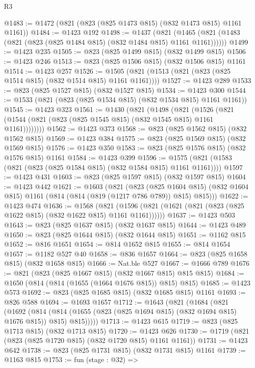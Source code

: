 \begin{lexlean}{R3}
\begin{coremodule}
@1483 := @1472 (@821 (@823 (@825 @1473 @815) (@832 @1473 @815) @1161 @1161))
@1484 := @1423 @192
@1498 := @1437
    (@821 (@1465 (@821 (@1483 (@821 (@823 (@825 @1484 @815) (@832 @1484 @815) @1161 @1161))))))
@1499 := @1423 @235
@1505 := @823 (@825 @1499 @815) (@832 @1499 @815)
@1506 := @1423 @246
@1513 := @823 (@825 @1506 @815) (@832 @1506 @815) @1161
@1514 := @1423 @257
@1526 := @1505 (@821 (@1513 (@821 (@823 (@825 @1514 @815) (@832 @1514 @815) @1161 @1161))))
@1527 := @1423 @289
@1533 := @823 (@825 @1527 @815) (@832 @1527 @815)
@1534 := @1423 @300
@1544 := @1533 (@821 (@823 (@825 @1534 @815) (@832 @1534 @815) @1161 @1161))
@1545 := @1423 @323
@1561 := @1430
    (@821
      (@1498
        (@821
          (@1526 (@821 (@1544 (@821 (@823 (@825 @1545 @815) (@832 @1545 @815) @1161 @1161))))))))
@1562 := @1423 @373
@1568 := @823 (@825 @1562 @815) (@832 @1562 @815)
@1569 := @1423 @384
@1575 := @823 (@825 @1569 @815) (@832 @1569 @815)
@1576 := @1423 @350
@1583 := @823 (@825 @1576 @815) (@832 @1576 @815) @1161
@1584 := @1423 @399
@1596 := @1575 (@821 (@1583 (@821 (@823 (@825 @1584 @815) (@832 @1584 @815) @1161 @1161))))
@1597 := @1423 @431
@1603 := @823 (@825 @1597 @815) (@832 @1597 @815)
@1604 := @1423 @442
@1621 := @1603
    (@821
      (@823
        (@825 @1604 @815)
        (@832 @1604 @815)
        @1161
        (@814 (@814 (@819 (@1217 @786 @789)) @815) @815)))
@1622 := @1423 @474
@1636 := @1568
    (@821 (@1596 (@821 (@1621 (@821 (@823 (@825 @1622 @815) (@832 @1622 @815) @1161 @1161))))))
@1637 := @1423 @503
@1643 := @823 (@825 @1637 @815) (@832 @1637 @815)
@1644 := @1423 @489
@1650 := @823 (@825 @1644 @815) (@832 @1644 @815)
@1651 := @1162 @815
@1652 := @816 @1651
@1654 := @814 @1652 @815
@1655 := @814 @1654
@1657 := @1182 @527 @40
@1658 := @836 @1657
@1664 := @823 (@825 @1658 @815) (@832 @1658 @815)
@1666 := Nat.ble @527
@1667 := @1666 @789
@1676 := @821 (@823 (@825 @1667 @815) (@832 @1667 @815) @815 @815)
@1684 := @1650 (@814 (@814 (@1655 (@1664 @1676 @815)) @815) @815)
@1685 := @1423 @573
@1692 := @823 (@825 @1685 @815) (@832 @1685 @815) @1161
@1693 := @826 @588
@1694 := @1693 @1657
@1712 := @1643
    (@821
      (@1684
        (@821
          (@1692
            (@814
              (@814 (@1655 (@823 (@825 @1694 @815) (@832 @1694 @815) @1676 @815)) @815)
              @815)))))
@1713 := @1423 @615
@1719 := @823 (@825 @1713 @815) (@832 @1713 @815)
@1720 := @1423 @626
@1730 := @1719 (@821 (@823 (@825 @1720 @815) (@832 @1720 @815) @1161 @1161))
@1731 := @1423 @642
@1738 := @823 (@825 @1731 @815) (@832 @1731 @815) @1161
@1739 := @1163 @815
@1753 := fun (stage : @32) =>

\end{coremodule}
\end{lexlean}
